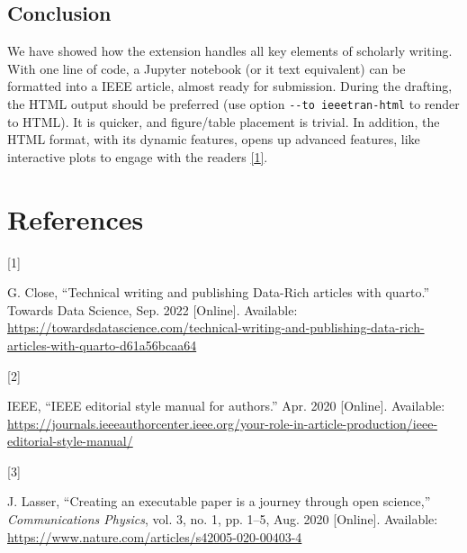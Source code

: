 \documentclass[
  10pt,
  letterpaper,
  journal,
  twoside]{IEEEtran}
\newlength{\cslhangindent}
\newlength{\csllabelwidth}
\newlength{\cslentryspacingunit} %
\newenvironment{CSLReferences}[2] %
 {%
  \setlength{\parindent}{0pt}
  \ifodd #1
  \let\oldpar\par
  \def\par{\hangindent=\cslhangindent\oldpar}
  \fi
  \setlength{\parskip}{#2\cslentryspacingunit}
 }%
 {}
\newcommand{\CSLLeftMargin}[1]{\parbox[t]{\csllabelwidth}{#1}}
\newcommand{\CSLRightInline}[1]{\parbox[t]{\linewidth - \csllabelwidth}{#1}\break}
\begin{document}
\hypertarget{conclusion}{%
\subsection{Conclusion}\label{conclusion}}

We have showed how the extension handles all key elements of scholarly
writing. With one line of code, a Jupyter notebook (or it text
equivalent) can be formatted into a IEEE article, almost ready for
submission. During the drafting, the HTML output should be preferred
(use option \texttt{-\/-to\ ieeetran-html} to render to HTML). It is
quicker, and figure/table placement is trivial. In addition, the HTML
format, with its dynamic features, opens up advanced features, like
interactive plots to engage with the readers
\protect\hyperlink{ref-Close2022-dt}{{[}1{]}}.

\hypertarget{bibliography}{%
\section*{References}\label{bibliography}}

\hypertarget{refs}{}
\begin{CSLReferences}{0}{0}
\leavevmode{}%
\CSLLeftMargin{{[}1{]} }%
\CSLRightInline{G. Close, {``Technical writing and publishing
{Data-Rich} articles with quarto.''} Towards Data Science, Sep. 2022
{[}Online{]}. Available:
\url{https://towardsdatascience.com/technical-writing-and-publishing-data-rich-articles-with-quarto-d61a56bcaa64}}

\leavevmode{}%
\CSLLeftMargin{{[}2{]} }%
\CSLRightInline{IEEE, {``{IEEE} editorial style manual for authors.''}
Apr. 2020 {[}Online{]}. Available:
\url{https://journals.ieeeauthorcenter.ieee.org/your-role-in-article-production/ieee-editorial-style-manual/}}

\leavevmode{}%
\CSLLeftMargin{{[}3{]} }%
\CSLRightInline{J. Lasser, {``Creating an executable paper is a journey
through open science,''} \emph{Communications Physics}, vol. 3, no. 1,
pp. 1--5, Aug. 2020 {[}Online{]}. Available:
\url{https://www.nature.com/articles/s42005-020-00403-4}}

\end{CSLReferences}

\end{document}
